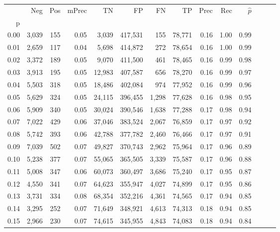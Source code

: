 \begin{tabular}{rrrrrrrrrrrrrr}
\toprule
{} &    Neg &    Pos & mPrec &       TN &       FP &      FN &      TP &  Prec &   Rec & $\hat{p}$ \\
p    &        &        &       &          &          &         &         &       &       &           \\
\midrule
0.00 &  3,039 &    155 &  0.05 &    3,039 &  417,531 &     155 &  78,771 &  0.16 &  1.00 &      0.99 \\
0.01 &  2,659 &    117 &  0.04 &    5,698 &  414,872 &     272 &  78,654 &  0.16 &  1.00 &      0.99 \\
0.02 &  3,372 &    189 &  0.05 &    9,070 &  411,500 &     461 &  78,465 &  0.16 &  0.99 &      0.98 \\
0.03 &  3,913 &    195 &  0.05 &   12,983 &  407,587 &     656 &  78,270 &  0.16 &  0.99 &      0.97 \\
0.04 &  5,503 &    318 &  0.05 &   18,486 &  402,084 &     974 &  77,952 &  0.16 &  0.99 &      0.96 \\
0.05 &  5,629 &    324 &  0.05 &   24,115 &  396,455 &   1,298 &  77,628 &  0.16 &  0.98 &      0.95 \\
0.06 &  5,909 &    340 &  0.05 &   30,024 &  390,546 &   1,638 &  77,288 &  0.17 &  0.98 &      0.94 \\
0.07 &  7,022 &    429 &  0.06 &   37,046 &  383,524 &   2,067 &  76,859 &  0.17 &  0.97 &      0.92 \\
0.08 &  5,742 &    393 &  0.06 &   42,788 &  377,782 &   2,460 &  76,466 &  0.17 &  0.97 &      0.91 \\
0.09 &  7,039 &    502 &  0.07 &   49,827 &  370,743 &   2,962 &  75,964 &  0.17 &  0.96 &      0.89 \\
0.10 &  5,238 &    377 &  0.07 &   55,065 &  365,505 &   3,339 &  75,587 &  0.17 &  0.96 &      0.88 \\
0.11 &  5,008 &    347 &  0.06 &   60,073 &  360,497 &   3,686 &  75,240 &  0.17 &  0.95 &      0.87 \\
0.12 &  4,550 &    341 &  0.07 &   64,623 &  355,947 &   4,027 &  74,899 &  0.17 &  0.95 &      0.86 \\
0.13 &  3,731 &    334 &  0.08 &   68,354 &  352,216 &   4,361 &  74,565 &  0.17 &  0.94 &      0.85 \\
0.14 &  3,295 &    252 &  0.07 &   71,649 &  348,921 &   4,613 &  74,313 &  0.18 &  0.94 &      0.85 \\
0.15 &  2,966 &    230 &  0.07 &   74,615 &  345,955 &   4,843 &  74,083 &  0.18 &  0.94 &      0.84 \\

\end{tabular}
